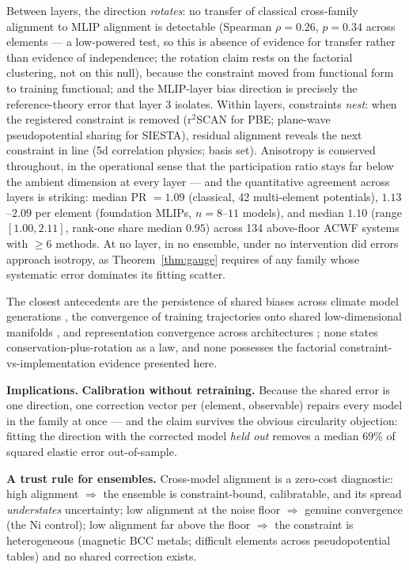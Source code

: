 \documentclass[11pt]{article}
\begin{document}
Between layers, the direction \emph{rotates}: no transfer of classical
cross-family alignment to MLIP alignment is detectable (Spearman $\rho = 0.26$,
$p = 0.34$ across elements --- a low-powered test, so this is absence of
evidence for transfer rather than evidence of independence; the rotation claim
rests on the factorial clustering, not on this null), because the constraint
moved from functional form to training functional; and the MLIP-layer bias
direction is precisely the reference-theory error that layer 3 isolates. Within
layers, constraints \emph{nest}: when the registered constraint is removed
(r$^2$SCAN for PBE; plane-wave pseudopotential sharing for SIESTA), residual
alignment reveals the next constraint in line (5d correlation physics; basis
set). Anisotropy is conserved throughout, in the operational sense that the
participation ratio stays far below the ambient dimension at every layer ---
and the quantitative agreement across layers is striking: median PR $= 1.09$
(classical, 42 multi-element potentials), $1.13$--$2.09$ per element
(foundation MLIPs, $n = 8$--$11$ models), and median $1.10$ (range $[1.00, 2.11]$,
rank-one share median $0.95$) across 134 above-floor ACWF systems with
$\geq 6$ methods. At no layer, in no ensemble, under no intervention did errors
approach isotropy, as Theorem~\ref{thm:gauge} requires of any family whose
systematic error dominates its fitting scatter.

The closest antecedents are the persistence of shared biases across climate
model generations \citep{tian2020,knutti2013}, the convergence of training
trajectories onto shared low-dimensional manifolds \citep{mao2024}, and
representation convergence across architectures \citep{huh2024}; none states
conservation-plus-rotation as a law, and none possesses the factorial
constraint-vs-implementation evidence presented here.

\textbf{Implications.} \textbf{Calibration without retraining.} Because the
shared error is one direction, one correction vector per (element, observable)
repairs every model in the family at once --- and the claim survives the obvious
circularity objection: fitting the direction with the corrected model
\emph{held out} removes a median $69\%$ of squared elastic error out-of-sample.

\textbf{A trust rule for ensembles.} Cross-model alignment is a zero-cost
diagnostic: high alignment $\Rightarrow$ the ensemble is constraint-bound,
calibratable, and its spread \emph{understates} uncertainty; low alignment at
the noise floor $\Rightarrow$ genuine convergence (the Ni control); low
alignment far above the floor $\Rightarrow$ the constraint is heterogeneous
(magnetic BCC metals; difficult elements across pseudopotential tables) and no
shared correction exists.
\end{document}
